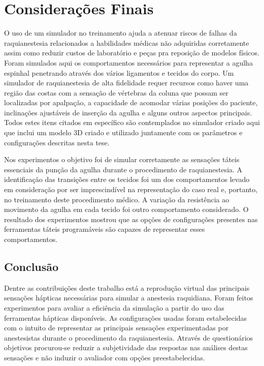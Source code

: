 \chapter{Considerações Finais} \label{cap:cap6}

O uso de um simulador no treinamento ajuda a atenuar riscos de falhas da raquianestesia relacionados a habilidades médicas não adquiridas corretamente assim como reduzir custos de laboratório e peças pra reposição de modelos físicos. Foram simulados aqui os comportamentos necessários para representar a agulha espinhal penetrando através dos vários ligamentos e tecidos do corpo. Um simulador de raquianestesia de alta fidelidade requer recursos como haver uma região das costas com a sensação de vértebras da coluna que possam ser localizadas por apalpação, a capacidade de acomodar várias posições do paciente, inclinações ajustáveis de inserção da agulha e alguns outros aspectos principais. Todos estes itens citados em específico são contemplados no simulador criado aqui que inclui um modelo 3D criado e utilizado juntamente com os parâmetros e configurações descritas nesta tese. 

Nos experimentos o objetivo foi de simular corretamente as sensações táteis essenciais da punção da agulha durante o procedimento de raquianestesia. A identificação das transições entre os tecidos foi um dos comportamentos levado em consideração por ser imprescindível na representação do caso real e, portanto, no treinamento deste procedimento médico.
A variação da resistência ao movimento da agulha em cada tecido foi outro comportamento considerado. O resultado dos experimentos mostrou que as opções de configurações presentes nas ferramentas táteis programáveis são capazes de representar esses comportamentos.

\section{Conclusão}
\label{sec:conclusão}

Dentre as contribuições deste trabalho está a reprodução virtual das principais sensações hápticas necessárias para simular a anestesia raquidiana. Foram feitos experimentos para avaliar a eficiência da simulação a partir do uso das ferramentas hápticas disponíveis. As configurações usadas foram estabelecidas com o intuito de representar as principais sensações experimentadas por anestesistas durante o procedimento da raquianestesia. Através de questionários objetivos procurou-se reduzir a subjetividade das respostas nas análises destas sensações e não induzir o avaliador com opções preestabelecidas.  

